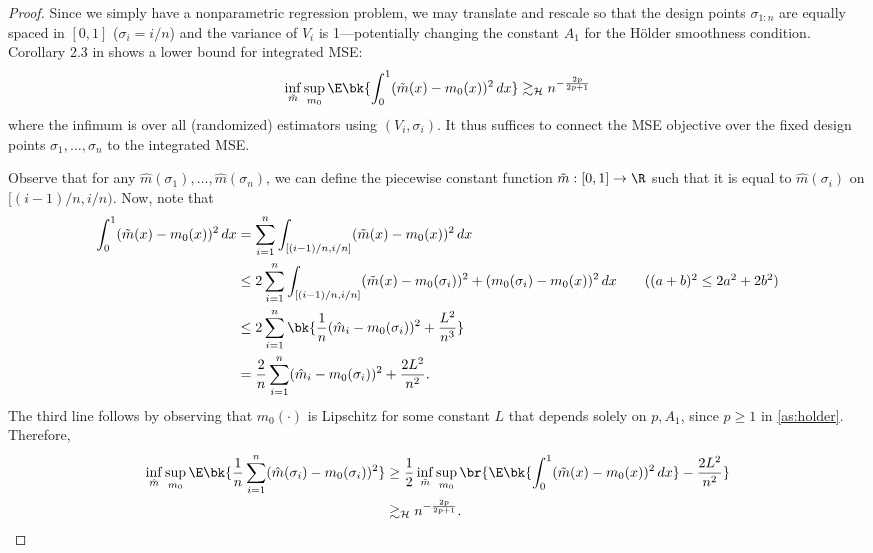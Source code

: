 \documentclass[12pt, reqno]{amsart}
\newcommand{\Hyperparams}{\mathcal{H}}
\newcommand{\hatm}{\hat m}
\numberwithin{equation}{section}
\begin{document}
\begin{refsection}
\begin{appendices}
\begin{proof}
Since we simply have a nonparametric regression problem,
we may translate and rescale so that the design points $\sigma_ {1:n}$ are equally spaced
in $[0, 1]$ ($\sigma_i = i/n$) and the variance of $V_i$ is 1---potentially changing the
constant $A_1$ for
the H\"older smoothness condition. Corollary 2.3 in \citet{tsybakov2008introduction} shows
a lower bound for integrated MSE: \[
\inf_{\tilde m} \sup_{m_0} \E\bk{\int_{0}^1 (\tilde m
(x) - m_0(x))^2\,dx} \gtrsim_\Hyperparams n^{-\frac{2p}{2p+1}}
\]
where the infimum is over all (randomized) estimators using $(V_i, \sigma_i)$. It thus
suffices to connect the MSE objective over the fixed design points
$\sigma_1,\ldots,\sigma_n$ to the integrated
MSE. 












Observe that for any $\hatm(\sigma_1),\ldots,
\hatm(\sigma_n)$, we can define the piecewise constant function $\tilde m : [0,1] \to
\R$ such
 that it is equal to $\hatm(\sigma_i)$ on $[(i-1)/n, i/n)$.  Now, note that \begin{align*}
\int_{0}^1 (\tilde m(x) - m_0(x))^2 \,dx &= \sum_{i=1}^n \int_{[(i-1)/n, i/n]} (\tilde
m (x) - m_0(x))^2 \,dx
\\
&\le 2\sum_{i=1}^n \int_{[(i-1)/n, i/n]} (\tilde m(x) - m_0(\sigma_i))^2 + (m_0(\sigma_i)
- m_0(x))^2 \,dx \tag{$(a+b)^2 \le 2a^2 + 2b^2$} \\
&\le 2\sum_{i=1}^n \bk{\frac{1}{n} (\hat m_i - m_0(\sigma_i))^2  + \frac{L^2}{n^3}} \\
&=  \frac{2}{n} \sum_{i=1}^n (\hat m_i - m_0(\sigma_i))^2 + \frac{2L^2}{n^2}.
\end{align*}
The third line follows by observing that $m_0(\cdot)$ is Lipschitz for some constant $L$
that depends solely on $p, A_1$, since $p \ge 1$ in \cref{as:holder}. Therefore,
\begin{align*}
\inf_{\hatm} \sup_{m_0}  \E\bk{\frac{1}{n} \sum_{i=1}^n (\hat m(\sigma_i) - m_0
(\sigma_i))^2} &\ge  \frac{1}{2}  \inf_{\tilde m} \sup_{m_0} \br{\E\bk{\int_{0}^1 (\tilde m
(x) - m_0(x))^2\,dx} - \frac{2L^2}{n^2}} \\
&\gtrsim_\Hyperparams n^{-\frac{2p}{2p+1}}.\qedhere
\end{align*}
\end{proof}



\end{appendices}
\end{refsection}
\end{document}
